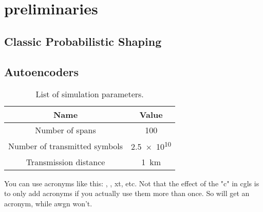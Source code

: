 \chapter{preliminaries}\label{chap:preliminaries}
\section*{Classic Probabilistic Shaping}
\section*{Autoencoders}
\begin{table}[!htb]
    \centering
    \caption{List of simulation parameters.}
    \begin{tabular}{cc}
    Name & Value\\
    \hline
    Number of spans & \num{100}\\
    Number of transmitted symbols & \num{2.5e10}\\
    Transmission distance & \SI{1}{\km}
    \end{tabular}
    \label{tbl:demo}
\end{table}

You can use acronyms like this: , , \acrlong{xt}, etc.
Not that the effect of the "c" in cgls is to only add acronyms if you actually use them more than once. So  will get an acronym, while awgn won't.
